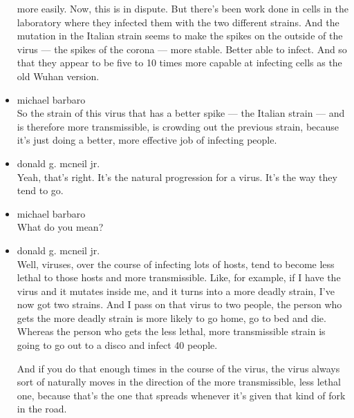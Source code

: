 \begin{itemize}
  more easily. Now, this is in dispute. But there's been work done in
  cells in the laboratory where they infected them with the two
  different strains. And the mutation in the Italian strain seems to
  make the spikes on the outside of the virus --- the spikes of the
  corona --- more stable. Better able to infect. And so that they appear
  to be five to 10 times more capable at infecting cells as the old
  Wuhan version.
\item
  michael barbaro\\
  So the strain of this virus that has a better spike --- the Italian
  strain --- and is therefore more transmissible, is crowding out the
  previous strain, because it's just doing a better, more effective job
  of infecting people.
\item
  donald g. mcneil jr.\\
  Yeah, that's right. It's the natural progression for a virus. It's the
  way they tend to go.
\item
  michael barbaro\\
  What do you mean?
\item
  donald g. mcneil jr.\\
  Well, viruses, over the course of infecting lots of hosts, tend to
  become less lethal to those hosts and more transmissible. Like, for
  example, if I have the virus and it mutates inside me, and it turns
  into a more deadly strain, I've now got two strains. And I pass on
  that virus to two people, the person who gets the more deadly strain
  is more likely to go home, go to bed and die. Whereas the person who
  gets the less lethal, more transmissible strain is going to go out to
  a disco and infect 40 people.

  And if you do that enough times in the course of the virus, the virus
  always sort of naturally moves in the direction of the more
  transmissible, less lethal one, because that's the one that spreads
  whenever it's given that kind of fork in the road.


\end{itemize}
